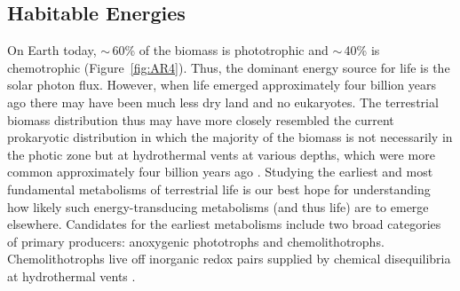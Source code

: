 \subsection{Habitable Energies}
\label{sec:HabEnergies}
On Earth today, $\sim$\,60\% of the biomass is phototrophic and $\sim$\,40\% is chemotrophic (Figure~\ref{fig:AR4}). Thus, the dominant energy source for life is the solar photon flux. However, when life emerged approximately four billion years ago there may have been much less dry land \citep{Taylor2009} and no eukaryotes. The terrestrial biomass distribution thus may have more closely resembled the current prokaryotic distribution in which the majority of the biomass is not necessarily in the photic zone but at hydrothermal vents at various depths, which were more common approximately four billion years ago \citep{Southam2007,Sleep2010}. Studying the earliest and most fundamental metabolisms of terrestrial life is our best hope for understanding how likely such energy-transducing metabolisms (and thus life) are to emerge elsewhere. Candidates for the earliest metabolisms include two broad categories of primary producers: anoxygenic phototrophs and chemolithotrophs. Chemolithotrophs live off inorganic redox pairs supplied by chemical disequilibria at hydrothermal vents \citep{Nisbet2001,Kelly2006}.

